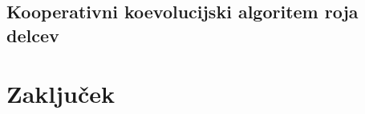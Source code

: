 \begin{table}[t]
\begin{small}
\begin{tabular}{|c|c|c|c|c|c|c|c|}
    \end{tabular}
\end{small}
\end{table}


\section{Kooperativni koevolucijski algoritem roja delcev}


\chapter{Zaključek}\label{chap:end}


